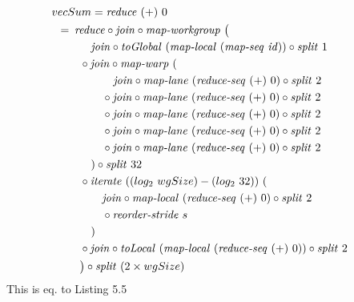 \begin{align}
  &\hspace{-1.5em}vecSum = \reduce\ (+)\ 0\nonumber\\
  &\hspace{-2em}\quad\begin{aligned}
    &=\hspace{.2em}
      \reduce \circ \join \circ \mapWorkgroup\ \big(\\
      &\qquad\quad \join \circ \toGlobal\ (\mapLocal\ (\mapSeq\ \id)) \circ \splitN\ 1\\
      &\qquad \circ \join \circ \mapWarp\ (\\
      &\qquad\qquad\ \ \ \join \circ \mapLane\ (\reduceSeq\ (+)\ 0) \circ \splitN\ 2\\
      &\qquad\qquad \circ \join \circ \mapLane\ (\reduceSeq\ (+)\ 0) \circ \splitN\ 2\\
      &\qquad\qquad \circ \join \circ \mapLane\ (\reduceSeq\ (+)\ 0) \circ \splitN\ 2\\
      &\qquad\qquad \circ \join \circ \mapLane\ (\reduceSeq\ (+)\ 0) \circ \splitN\ 2\\
      &\qquad\qquad \circ \join \circ \mapLane\ (\reduceSeq\ (+)\ 0) \circ \splitN\ 2\\
      &\qquad\quad) \circ \splitN\ 32\\
      &\qquad \circ \iterateN\ ((log_2\ wgSize) - (log_2\ 32))\ (\\
      &\qquad\qquad \join \circ \mapLocal\ (\reduceSeq\ (+)\ 0) \circ \splitN\ 2\\
      &\qquad\qquad \circ \reorderStride\ s\\
      &\qquad\quad)\\
      &\qquad \circ \join \circ \toLocal\ (\mapLocal\ (\reduceSeq\ (+)\ 0)) \circ \splitN\ 2\\
      &\qquad\big) \circ \splitN\ (2\times wgSize)
  \end{aligned}
\end{align}
This is eq. to Listing 5.5

